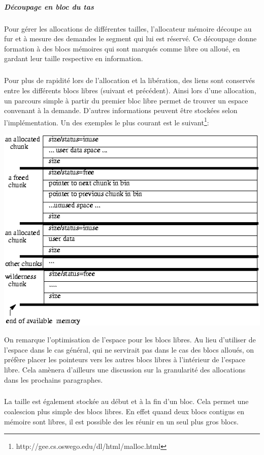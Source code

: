 \subparagraph{Découpage en bloc du tas}
Pour gérer les allocations de différentes tailles, l'allocateur mémoire découpe au fur et à mesure des demandes
le segment qui lui est réservé. Ce découpage donne formation à des blocs mémoires qui sont marqués comme libre ou alloué, en gardant leur taille respective
en information.
\subparagraph{}
Pour plus de rapidité lors de l'allocation et la libération, des liens sont conservés entre les différents blocs libres (suivant et précédent). Ainsi lors d'une allocation,
un parcours simple à partir du premier bloc libre permet de trouver un espace convenant à la demande. D'autres informations peuvent être stockées selon l'implémentation.
Un des exemples le plus courant est le suivant\footnote{http://gee.cs.oswego.edu/dl/html/malloc.html}:
\begin{center}
\includegraphics[scale=0.5]{malloc.png}\newline
\end{center}

On remarque l'optimisation de l'espace pour les blocs libres. Au lieu d'utiliser de l'espace dans le cas général, qui ne servirait pas dans le cas des blocs alloués,
on préfère placer les pointeurs vers les autres blocs libres à l'intérieur de l'espace libre. Cela amènera d'ailleurs une discussion sur la granularité des allocations dans
les prochains paragraphes.
\subparagraph{}
La taille est également stockée au début et à la fin d'un bloc. Cela permet une coalescion plus simple des blocs libres. En effet quand deux blocs contigus en
mémoire sont libres, il est possible des les réunir en un seul plus gros blocs.

